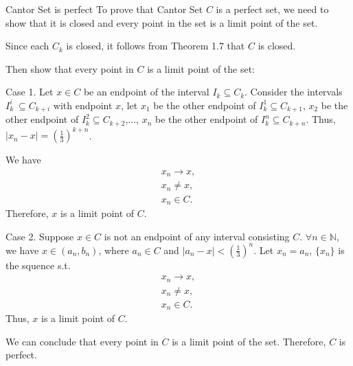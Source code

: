 \documentclass[UTF8,a4paper,10pt]{article}
\begin{document}
  \begin{mybox}{Cantor Set is perfect}
    To prove that Cantor Set \(C\) is a perfect set, we need to show that it is closed and every point in the set is a limit point of the set.

    Since each \(C_k\) is closed, it follows from Theorem 1.7 that \(C\) is closed. 

    Then show that every point in \(C\) is a limit point of the set:

    Case 1. Let \(x\in C\) be an endpoint of the interval \(I_k\subseteq C_k\). Consider the intervals \(I_k^i\ \subseteq C_{k+i}\) with endpoint \(x\), let \(x_1\) be the other endpoint of \(I_k^1\subseteq C_{k+1}\), \(x_2\) be the other endpoint of \(I_k^2\subseteq C_{k+2}\),..., \(x_n\) be the other endpoint of \(I_k^n \subseteq C_{k+n}\). 
    Thus, \(|x_n-x|=(\frac{1}{3})^{k+n}\).

    We have 
    \begin{equation*}
      \begin{aligned}
        x_n\to x,\\
        x_n \neq x,\\
        x_n \in C.
      \end{aligned}
    \end{equation*}
    Therefore, \(x\) is a limit point of \(C\).

    Case 2. Suppose \(x\in C\) is not an endpoint of any interval consisting \(C\). \(\forall n\in\mathbb{N}\), we have \(x\in (a_n, b_n)\), where \(a_n\in C\) and \(|a_n-x|<(\frac{1}{3})^{n}\). Let \(x_n = a_n\), \(\{x_n\}\) is the squence s.t. 
    \begin{equation*}
      \begin{aligned}
        x_n\to x,\\
        x_n \neq x,\\
        x_n \in C.
      \end{aligned}
    \end{equation*}
    Thus, \(x\) is a limit point of \(C\).

    We can conclude that every point in \(C\) is a limit point of the set. Therefore, \(C\) is perfect.

    
  \end{mybox}


  \begin{solution}

    \begin{equation*}
      \begin{aligned}
      \end{aligned}
    \end{equation*}
 

  \end{solution}
  \pagebreak
\end{document}

